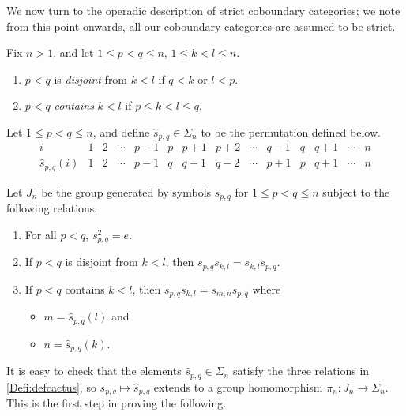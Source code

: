 \documentclass{amsbook} %
\numberwithin{section}{chapter}
\begin{document}
We now turn to the operadic description of strict coboundary categories; we note from this point onwards, all our coboundary categories are assumed to be strict.

\begin{Defi}
Fix $n>1$, and let $1 \leq p < q \leq n$, $1 \leq k < l \leq n$.
\begin{enumerate}
\item $p<q$ is \textit{disjoint} from $k<l$ if $q<k$ or $l<p$.
\item $p<q$ \textit{contains} $k<l$ if $p \leq k < l \leq q$.
\end{enumerate}
\end{Defi}

\begin{Defi}
Let $1 \leq p < q \leq n$, and define $\hat{s}_{p,q} \in \Sigma_{n}$ to be the permutation defined below.
\[
\begin{array}{r|ccccccccccccc}
i & 1 & 2 & \cdots & p-1 & p & p+1 & p+2 & \cdots & q-1 & q & q+1 & \cdots & n \\
\hat{s}_{p,q}(i) & 1 & 2 & \cdots & p-1 & q & q-1 & q-2 & \cdots & p+1 & p & q+1 & \cdots & n
\end{array}
\]
\end{Defi}


\begin{Defi}\label{Defi:defcactus}
Let $J_{n}$ be the group generated by symbols $s_{p,q}$ for $1 \leq p < q \leq n$ subject to the following relations.
\begin{enumerate}
\item For all $p < q$, $s_{p,q}^{2}=e$.
\item If $p<q$ is disjoint from $k<l$, then $s_{p,q}s_{k,l} = s_{k,l}s_{p,q}$.
\item If $p<q$ contains $k<l$, then $s_{p,q}s_{k,l} = s_{m,n}s_{p,q}$ where
\begin{itemize}
\item $m = \hat{s}_{p,q}(l)$ and
\item $n = \hat{s}_{p,q}(k)$.
\end{itemize}
\end{enumerate}
\end{Defi}

It is easy to check that the elements $\hat{s}_{p,q} \in \Sigma_{n}$ satisfy the three relations in  \cref{Defi:defcactus}, so $s_{p,q} \mapsto \hat{s}_{p,q}$ extends to a group homomorphism $\pi_{n}:J_{n} \rightarrow \Sigma_{n}$.  This is the first step in proving the following.
\end{document}
